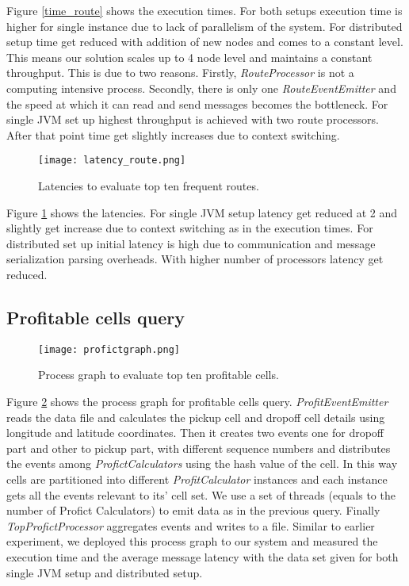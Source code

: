 Figure \ref{time_route} shows the execution times. For both setups execution time is higher for single instance due to lack of parallelism of the system. For distributed setup time get reduced with addition of new nodes and comes to a constant level. This means our solution scales up to 4 node level and maintains a constant throughput. This is due to two reasons. Firstly, \textit{RouteProcessor} is not a computing intensive process. Secondly, there is only one \textit{RouteEventEmitter} and the speed at which it can read and send messages becomes the bottleneck. For single JVM set up highest throughput is achieved with two route processors. After that point time get slightly increases due to context switching.

\begin{figure}[!t]
        \centering
        \texttt{[image: latency\_route.png]}
        \caption{Latencies to evaluate top ten frequent routes.}
        \label{latency_route}
\end{figure}


Figure \ref{latency_route} shows the latencies. For single JVM setup latency get reduced at 2 and slightly get increase due to context switching as in the execution times. For distributed set up initial latency is high due to communication and message serialization parsing overheads. With higher number of processors latency get reduced.

\subsection{Profitable cells query}

\begin{figure}[!t]
        \centering
        \texttt{[image: profictgraph.png]}
        \caption{Process graph to evaluate top ten profitable cells.}
        \label{profictgraph}
\end{figure}

Figure \ref{profictgraph} shows the process graph for profitable cells query. \textit{ProfitEventEmitter} reads the data file and calculates the pickup cell and dropoff cell details using longitude and latitude coordinates. Then it creates two events one for dropoff part and other to pickup part, with different sequence numbers and distributes the events among \textit{ProfictCalculators} using the hash value of the cell. In this way cells are partitioned into different \textit{ProfitCalculator} instances and each instance gets all the events relevant to its' cell set. We use a set of threads (equals to the number of Profict Calculators) to emit data as in the previous query. Finally \textit{TopProfictProcessor} aggregates events and writes to a file. 
Similar to earlier experiment,  we deployed this process graph to our system and measured the execution time and the average message latency with the data set given for both single JVM setup and distributed setup.


